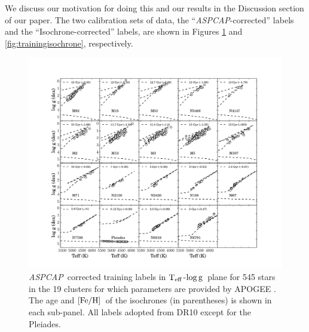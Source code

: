 \documentclass[12pt, preprint]{aastex}
\newcommand{\teff}{\mbox{$\rm T_{eff}$}}
\newcommand{\feh}{\mbox{$\rm [Fe/H]$}}
\newcommand{\logg}{\mbox{$\rm \log g$}}
\newcommand{\aspcap}{\textsl{ASPCAP}}
\begin{document}
We discuss our motivation for doing this and our results in the Discussion section of our paper.  
The two calibration sets of data, the ``\aspcap-corrected'' labels and the ``Isochrone-corrected'' labels, are shown in Figures \ref{fig:trainingaspcap} and \ref{fig:trainingisochrone}, respectively. 

\begin{figure}[h!]
\centering
    \includegraphics[scale=0.33]{./plots/training_aspcap.pdf}
\caption{\aspcap\ corrected training labels in \teff-\logg\ plane for 545 stars in the 19 clusters for which parameters are provided by APOGEE \citep{Meszaros2013}. The age and \feh\ of the isochrones (in parentheses) is shown in each sub-panel. All labels adopted from DR10 except for the Pleiades. }
\label{fig:trainingaspcap}
\end{figure}
\end{document}
